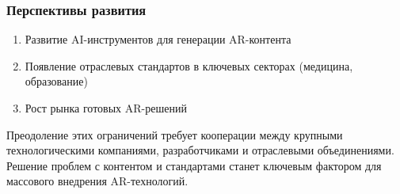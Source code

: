 \subsubsection{Перспективы развития}
\begin{enumerate}
    \item Развитие AI-инструментов для генерации AR-контента
    \item Появление отраслевых стандартов в ключевых секторах (медицина, образование)
    \item Рост рынка готовых AR-решений
\end{enumerate}

Преодоление этих ограничений требует кооперации между крупными технологическими компаниями, разработчиками и отраслевыми объединениями. Решение проблем с контентом и стандартами станет ключевым фактором для массового внедрения AR-технологий.